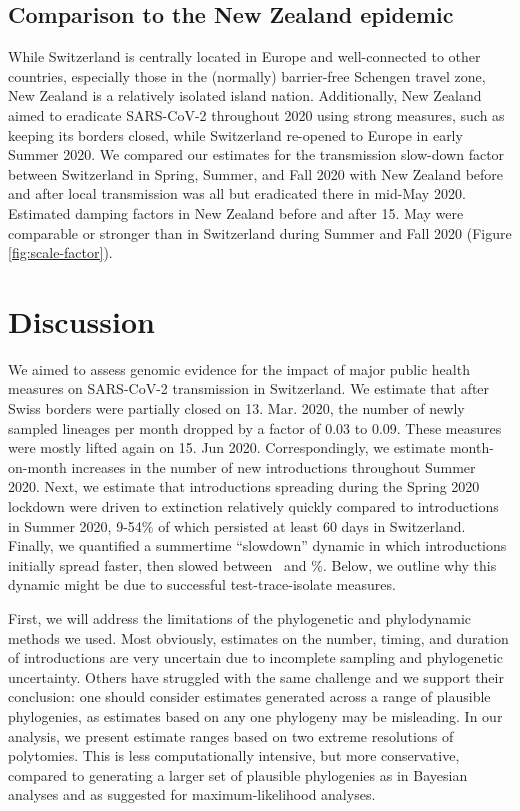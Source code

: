 \documentclass[9pt,twoside,lineno]{pnas-new} %
\begin{document}
\subsection{Comparison to the New Zealand epidemic}
While Switzerland is centrally located in Europe and well-connected to other countries, especially those in the (normally) barrier-free Schengen travel zone, New Zealand is a relatively isolated island nation. Additionally, New Zealand aimed to eradicate SARS-CoV-2 throughout 2020 using strong measures, such as keeping its borders closed, while Switzerland re-opened to Europe in early Summer 2020. We compared our estimates for the transmission slow-down factor between Switzerland in Spring, Summer, and Fall 2020 with New Zealand before and after local transmission was all but eradicated there in mid-May 2020. Estimated damping factors in New Zealand before and after 15. May were comparable or stronger than in Switzerland during Summer and Fall 2020 (Figure \ref{fig:scale-factor}).

\section{Discussion}
We aimed to assess genomic evidence for the impact of major public health measures on SARS-CoV-2 transmission in Switzerland. We estimate that after Swiss borders were partially closed on 13. Mar. 2020, the number of newly sampled lineages per month dropped by a factor of 0.03 to 0.09. These measures were mostly lifted again on 15. Jun 2020. Correspondingly, we estimate month-on-month increases in the number of new introductions throughout Summer 2020. Next, we estimate that introductions spreading during the Spring 2020 lockdown were driven to extinction relatively quickly compared to introductions in Summer 2020, 9-54\% of which persisted at least 60 days in Switzerland. Finally, we quantified a summertime ``slowdown'' dynamic in which introductions initially spread faster, then slowed between \summermaxdampingpercentmedianCHEnosampUB\ and \summermindampingpercentmedianCHEnosampUB \%. Below, we outline why this dynamic might be due to successful test-trace-isolate measures.

First, we will address the limitations of the phylogenetic and phylodynamic methods we used. Most obviously, estimates on the number, timing, and duration of introductions are very uncertain due to incomplete sampling and phylogenetic uncertainty. Others have struggled with the same challenge \cite{Morel2021} and we support their conclusion: one should consider estimates generated across a range of plausible phylogenies, as estimates based on any one phylogeny may be misleading. In our analysis, we present estimate ranges based on two extreme resolutions of polytomies. This is less computationally intensive, but more conservative, compared to generating a larger set of plausible phylogenies as in Bayesian analyses and as \cite{Morel2021} suggested for maximum-likelihood analyses.
\end{document}
